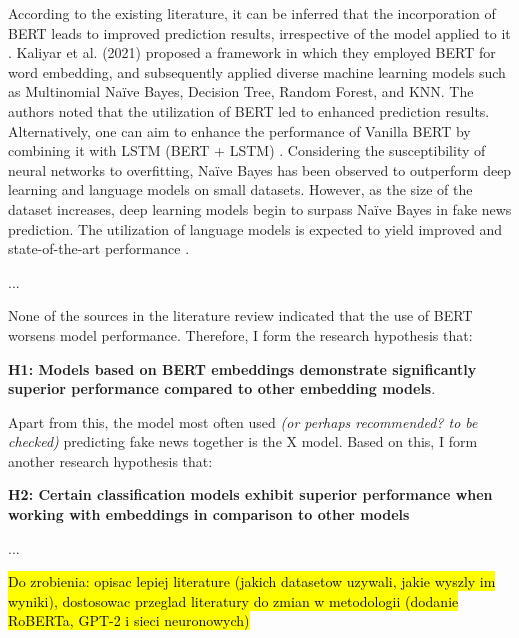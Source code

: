 According to the existing literature, it can be inferred that the incorporation of BERT leads to improved prediction results, irrespective of the model applied to it \autocite{Kaliyar2021}. Kaliyar et al. (2021) proposed a framework in which they employed BERT for word embedding, and subsequently applied diverse machine learning models such as Multinomial Naïve Bayes, Decision Tree, Random Forest, and KNN. The authors noted that the utilization of BERT led to enhanced prediction results. Alternatively, one can aim to enhance the performance of Vanilla BERT by combining it with LSTM (BERT + LSTM) \autocite{Rai2022}. 
Considering the susceptibility of neural networks to overfitting, Naïve Bayes has been observed to outperform deep learning and language models on small datasets. However, as the size of the dataset increases, deep learning models begin to surpass Naïve Bayes in fake news prediction. The utilization of language models is expected to yield improved and state-of-the-art performance \autocite{Khan2021}.

...

None of the sources in the literature review indicated that the use of BERT worsens model performance. Therefore, I form the research hypothesis that:
\vspace{0.2cm}

\noindent\textbf{H1: Models based on BERT embeddings demonstrate significantly superior performance compared to other embedding models}.
\vspace{0.2cm}

Apart from this, the model most often used \textit{(or perhaps recommended? to be checked)} predicting fake news together is the X model. Based on this, I form another research hypothesis that:
\vspace{0.2cm}

\noindent\textbf{H2: Certain classification models exhibit superior performance when working with embeddings in comparison to other models}
\vspace{0.2cm}

...


\hl{Do zrobienia: opisac lepiej literature (jakich datasetow uzywali, jakie wyszly im wyniki), dostosowac przeglad literatury do zmian w metodologii (dodanie RoBERTa, GPT-2 i sieci neuronowych)}
